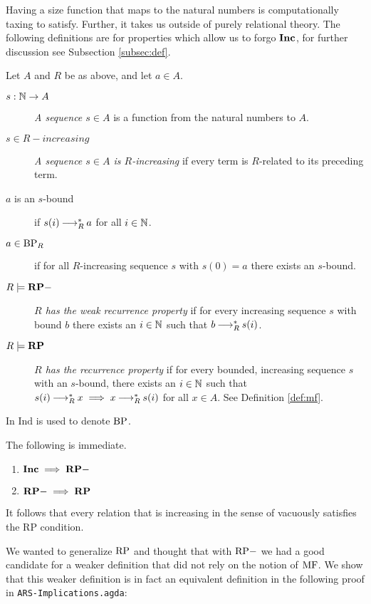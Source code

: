 Having a size function that maps to the natural numbers is computationally taxing to satisfy. 
Further, it takes us outside of purely relational theory. The following definitions are for properties which allow us to forgo $\mathbf{Inc}$, for further discussion see Subsection \ref{subsec:def}.
\begin{definition} \label{def:rp} Let $A$ and $R$ be as above, and let $a \in A$.
    \begin{description} 
        \item[$s : \mathbb{N} \to A$] \emph{A sequence $s \in A$} is a function from the natural numbers to $A$.  
        \item[$s \in R-increasing$] \emph{A sequence $s \in A$ is $R$-increasing} if every term is $R$-related to its preceding term.
        \item[$a$ is an $s$-bound] if $s (i) \mathbin{\longrightarrow_R^*} a$ for all $i \in \mathbb{N}$. 
        \item[$a \in \mathrm{BP}_R$] if for all $R$-increasing sequence $s$ with $s (0) = a$ there exists an $s$-bound.  
        \item[$R \models \mathbf{RP-}$] \emph{$R$ has the weak recurrence property} if for every increasing sequence $s$ with bound $b$ there exists an $i \in \mathbb{N}$ such that $b \mathbin{\longrightarrow_R^*} s (i)$.
        \item[$R \models \mathbf{RP}$] \emph{$R$ has the recurrence property} if for every bounded, increasing sequence $s$ with an $s$-bound, there exists an $i \in \mathbb{N}$ such that 
        $s (i) \mathbin{\longrightarrow_R^*} x \implies x \mathbin{\longrightarrow_R^*} s (i)$ for all $x\in A$. See Definition \ref{def:mf}. 
    \end{description}
\end{definition}

In \terese $\mathrm{Ind}$ is used to denote $\mathrm{BP}$. 

The following is immediate.
\begin{proposition}\hfill 
    \begin{enumerate}
        \item $\mathbf{Inc} \implies \mathbf{RP-}$
        \item $\mathbf{RP-} \implies \mathbf{RP}$
    \end{enumerate}
\end{proposition}


It follows that every relation that is increasing in the sense of \terese
vacuously satisfies the RP condition.

We wanted to generalize $\mathrm{RP}$ and thought that with $\mathrm{RP-}$ we had a good candidate for a weaker definition that 
did not rely on the notion of $\mathrm{MF}$. We show that this weaker definition is 
in fact an equivalent definition in the following proof in \texttt{ARS-Implications.agda}: 

